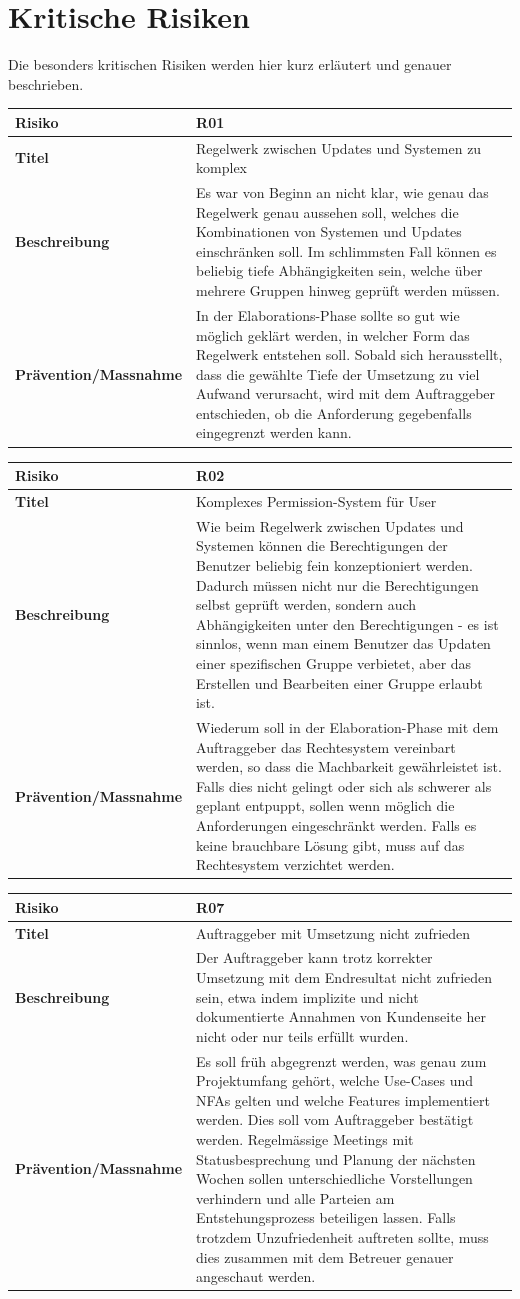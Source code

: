 \section{Kritische Risiken}

Die besonders kritischen Risiken werden hier kurz erläutert und genauer beschrieben.

\newcommand{\projectrisk}[4]{
	\begin{tabularx}{\linewidth}{lX}
		\toprule
		\textbf{Risiko} & #1\\
		\midrule
		\textbf{Titel} & #2\\
		\textbf{Beschreibung} & #3\\
		\textbf{Prävention/Massnahme} & #4\\
		\bottomrule
	\end{tabularx}
}


\projectrisk{R01}{Regelwerk zwischen Updates und Systemen zu komplex}
{Es war von Beginn an nicht klar, wie genau das Regelwerk genau aussehen soll, welches die Kombinationen von Systemen und Updates einschränken soll. Im schlimmsten Fall können es beliebig tiefe Abhängigkeiten sein, welche über mehrere Gruppen hinweg geprüft werden müssen.}
{In der Elaborations-Phase sollte so gut wie möglich geklärt werden, in welcher Form das Regelwerk entstehen soll. Sobald sich herausstellt, dass die gewählte Tiefe der Umsetzung zu viel Aufwand verursacht, wird mit dem Auftraggeber entschieden, ob die Anforderung gegebenfalls eingegrenzt werden kann.}


\projectrisk{R02}{Komplexes Permission-System für User}
{Wie beim Regelwerk zwischen Updates und Systemen können die Berechtigungen der Benutzer beliebig fein konzeptioniert werden. Dadurch müssen nicht nur die Berechtigungen selbst geprüft werden, sondern auch Abhängigkeiten unter den Berechtigungen - es ist sinnlos, wenn man einem Benutzer das Updaten einer spezifischen Gruppe verbietet, aber das Erstellen und Bearbeiten einer Gruppe erlaubt ist.}
{Wiederum soll in der Elaboration-Phase mit dem Auftraggeber das Rechtesystem vereinbart werden, so dass die Machbarkeit gewährleistet ist. Falls dies nicht gelingt oder sich als schwerer als geplant entpuppt, sollen wenn möglich die Anforderungen eingeschränkt werden. Falls es keine brauchbare Lösung gibt, muss auf das Rechtesystem verzichtet werden.}


\projectrisk{R07}{Auftraggeber mit Umsetzung nicht zufrieden}
{Der Auftraggeber kann trotz korrekter Umsetzung mit dem Endresultat nicht zufrieden sein, etwa indem implizite und nicht dokumentierte Annahmen von Kundenseite her nicht oder nur teils erfüllt wurden.}
{Es soll früh abgegrenzt werden, was genau zum Projektumfang gehört, welche Use-Cases und NFAs gelten und welche Features implementiert werden. Dies soll vom Auftraggeber bestätigt werden. Regelmässige Meetings mit Statusbesprechung und Planung der nächsten Wochen sollen unterschiedliche Vorstellungen verhindern und alle Parteien am Entstehungsprozess beteiligen lassen. Falls trotzdem Unzufriedenheit auftreten sollte, muss dies zusammen mit dem Betreuer genauer angeschaut werden.}


